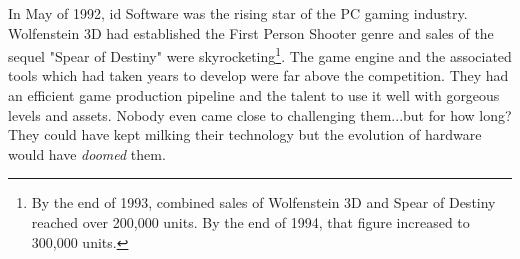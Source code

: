 In May of 1992, id Software was the rising star of the PC gaming industry. Wolfenstein 3D had established the First Person Shooter genre and sales of the sequel "Spear of Destiny" were skyrocketing\footnote{By the end of 1993, combined sales of Wolfenstein 3D and Spear of Destiny reached over 200,000 units. By the end of 1994, that figure increased to 300,000 units.}. The game engine and the associated tools which had taken years to develop were far above the competition. They had an efficient game production pipeline and the talent to use it well with gorgeous levels and assets. Nobody even came close to challenging them...but for how long? They could have kept milking their technology but the evolution of hardware would have \textit{doomed} them.\\
\par

